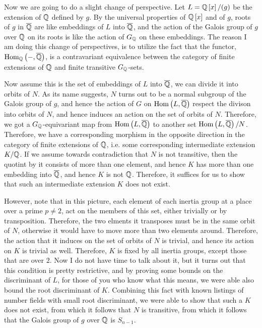 \documentclass[../../main.tex]{subfiles}
\begin{document}
Now we are going to do a slight change of perspective.
Let $L = \mathbb{Q}\left[ x \right] / (g)$ be the extension of $\mathbb{Q}$ defined by $g$.
By the universal properties of $\mathbb{Q}\left[ x \right]$ and of $g$, roots of $g$ in $\overline{\mathbb{Q}}$ are like embeddings of $L$ into $\overline{\mathbb{Q}}$, and the action of the Galois group of $g$ over $\mathbb{Q}$ on its roots is like the action of $G_{\mathbb{Q}}$ on these embeddings.
The reason I am doing this change of perspectives, is to utilize the fact that the functor, $\operatorname{\rm Hom}_{\mathbb{Q}}\left( -, \overline{\mathbb{Q}} \right)$, is a contravariant equivalence between the category of finite extensions of $\mathbb{Q}$ and finite transitive $G_{\mathbb{Q}}$-sets.  

Now assume this is the set of embeddings of $L$ into $\overline{\mathbb{Q}}$, we can divide it into orbits of $N$.
As its name suggests, $N$ turns out to be a normal subgroup of the Galois group of $g$, and hence the action of $G$ on $\operatorname{\rm Hom}\left( L, \overline{\mathbb{Q}} \right)$ respect the divison into orbits of $N$, and hence induces an action on the set of orbits of $N$.
Therefore, we got a $G_{\mathbb{Q}}$-equivariant map from $\operatorname{\rm Hom}\left( L, \overline{\mathbb{Q}} \right)$ to another set $\operatorname{\rm Hom}\left( L, \overline{\mathbb{Q}} \right) / N$.
Therefore, we have a corresponding morphism in the opposite direction in the category of finite extensions of $\mathbb{Q}$, i.e. some corresponding intermediate extension $K/ \mathbb{Q}$.
If we assume towards contradiction that $N$ is not transitive, then the quotint by it consists of more than one element, and hence $K$ has more than one embedding into $\overline{\mathbb{Q}}$, and hence $K$ is not $\mathbb{Q}$.
Therefore, it suffices for us to show that such an intermediate extension $K$ does not exist.

However, note that in this picture, each element of each inertia group at a place over a prime $p \neq 2$, act on the members of this set, either trivially or by transposition.
Therefore, the two elments it transposes must be in the same orbit of $N$, otherwise it would have to move more than two elements around.
Therefore, the action that it induces on the set of orbits of $N$ is trivial, and hence its action on $K$ is trivial as well.
Therefore, $K$ is fixed by all inertia groups, except those that are over $2$.
Now I do not have time to talk about it, but it turns out that this condition is pretty restrictive, and by proving some bounds on the discriminant of $L$, for those of you who know what this means, we were able also bound the root discriminant of $K$. 
Combining this fact with known listings of number fields with small root discriminant, we were able to show that such a $K$ does not exist, from which it follows that $N$ is transitive, from which it follows that the Galois group of $g$ over $\mathbb{Q}$ is $S_{n-1}$.
\end{document}
